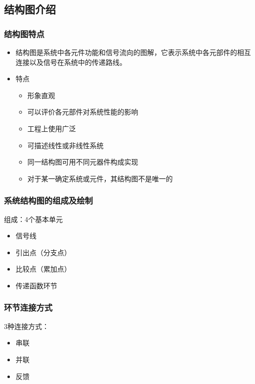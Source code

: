 \documentclass{article}
\begin{document}
\subsection{结构图介绍}
\label{sec-3-1}
\begin{frame}
\frametitle{结构图特点}
\label{sec-3-1-1}

\begin{itemize}
\item <2->结构图是系统中各元件功能和信号流向的图解，它表示系统中各元部件的相互连接以及信号在系统中的传递路线。
\item <3->特点
\begin{itemize}
\item <4-> 形象直观
\item <5-> 可以评价各元部件对系统性能的影响
\item <6-> 工程上使用广泛
\item <7-> 可描述线性或非线性系统
\item <8-> 同一结构图可用不同元器件构成实现
\item <9-> 对于某一确定系统或元件，其结构图不是唯一的
\end{itemize}
\end{itemize}
\end{frame}
\begin{frame}
\frametitle{系统结构图的组成及绘制}
\label{sec-3-1-2}

组成：4个基本单元
\begin{itemize}
\item <2-> 信号线
\item <3-> 引出点（分支点）
\item <4-> 比较点（累加点）
\item <5-> 传递函数环节
\end{itemize}
\end{frame}
\begin{frame}
\frametitle{环节连接方式}
\label{sec-3-1-3}

  3种连接方式：
\begin{itemize}
\item <2-> 串联
\item <3-> 并联
\item <4-> 反馈
\end{itemize}
\end{frame}
\end{document}
